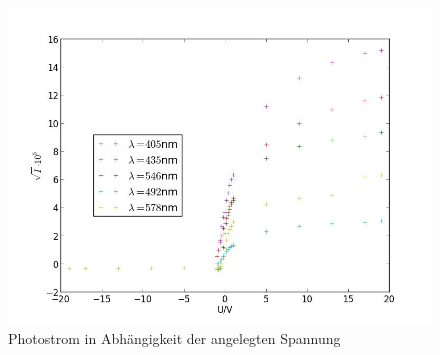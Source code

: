 	\begin{figure}[h]
		\begin{center}
		\includegraphics[scale=0.7]{picaALL.jpg}
		\caption{Photostrom in Abhängigkeit der angelegten Spannung}
		\label{picaALL}
		\end{center}	
	\end{figure}